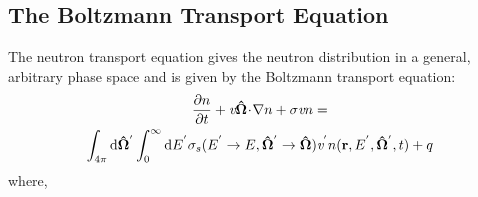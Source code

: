 \belowSubSecSkip

\subsection{The Boltzmann Transport Equation}
\label{sec:Transport-Boltz}

\noindent
	\indent The neutron transport equation gives the neutron distribution in a general, arbitrary
	phase space and is given by the Boltzmann transport equation:
	\begin{multline}
		\frac{\partial{n}}{\partial{t}}+\emph{v}\mathbf{\hat{\Omega}} \!\cdot\! \mathbf{\nabla}{n}
		 + \sigma\emph{v}{n} = \\ \int_{4\pi} \mathrm{d}\mathbf{\hat{\Omega}}^{'}\int_{0}^{\infty}
		 \mathrm{d}{E}^{'}\sigma_{s}({E}^{'}\rightarrow{E},
		 \mathbf{\hat{\Omega}}^{'}\rightarrow \mathbf{\hat{\Omega}})
		 \emph{v}^{'}{n}(\mathbf{r},E^{'},\mathbf{\hat{\Omega}}^{'},t)+q
	\label{eq:transport1}
	\end{multline}
	where, \vspace{10pt} \\
